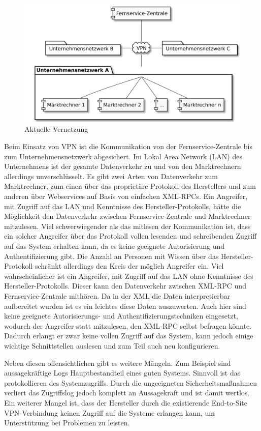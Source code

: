 \documentclass[11pt,a4paper]{report}
\begin{document}
\begin{figure}[htbp]
\centering
\includegraphics[scale=0.2]{images/problemfeld.pdf}
\caption{Aktuelle Vernetzung}
\label{fig:current_setup}
\end{figure}

Beim Einsatz von VPN ist die Kommunikation von der Fernservice-Zentrale bis zum Unternehmensnetzwerk abgesichert. Im Lokal Area Network (LAN) des Unternehmens ist der gesamte Datenverkehr zu und von den Marktrechnern allerdings unverschlüsselt. Es gibt zwei Arten von Datenverkehr zum Marktrechner, zum einen über das proprietäre Protokoll des Herstellers und zum anderen über Webservices auf Basis von einfachen XML-RPCs. Ein Angreifer, mit Zugriff auf das LAN und Kenntnisse des Hersteller-Protokolls, hätte die Möglichkeit den Datenverkehr zwischen Fernservice-Zentrale und Marktrechner mitzulesen. Viel schwerwiegender als das mitlesen der Kommunikation ist, dass ein solcher Angreifer über das Protokoll vollen lesenden und schreibenden Zugriff auf das System erhalten kann, da es keine geeignete Autorisierung und Authentifizierung gibt. Die Anzahl an Personen mit Wissen über das Hersteller-Protokoll schränkt allerdings den Kreis der möglich Angreifer ein. Viel wahrscheinlicher ist ein Angreifer, mit Zugriff auf das LAN ohne Kenntnisse des Hersteller-Protokolls. Dieser kann den Datenverkehr zwischen XML-RPC und Fernservice-Zentrale mithören. Da in der XML die Daten interpretierbar aufbereitet wurden ist es ein leichtes diese Daten auszuwerten. Auch hier sind keine geeignete Autorisierungs- und Authentifizierungstechniken eingesetzt, wodurch der Angreifer statt mitzulesen, den XML-RPC selbst befragen könnte. Dadurch erlangt er zwar keine vollen Zugriff auf das System, kann jedoch einige wichtige Schnittstellen auslesen und zum Teil auch neu konfigurieren. 

Neben diesen offensichtlichen gibt es weitere Mängeln. Zum Beispiel sind aussagekräftige Logs Hauptbestandteil eines guten Systems. Sinnvoll ist das protokollieren des Systemzugriffs. Durch die ungeeigneten Sicherheitsmaßnahmen verliert das Zugriffslog jedoch komplett an Aussagekraft und ist damit wertlos. Ein weiterer Mangel ist, dass der Hersteller durch die existierende End-to-Site VPN-Verbindung keinen Zugriff auf die Systeme erlangen kann, um Unterstützung bei Problemen zu leisten. 
\end{document}
